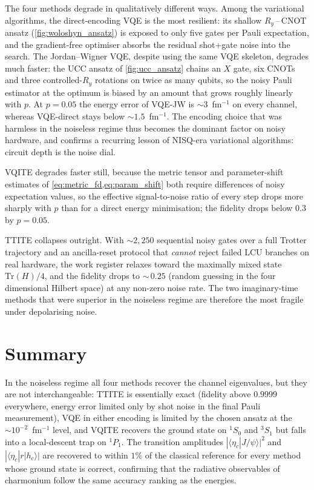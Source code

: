 The four methods degrade in qualitatively different ways. Among the
variational algorithms, the direct-encoding VQE is the most resilient:
its shallow $R_y$\,--\,CNOT ansatz (\cref{fig:woloshyn_ansatz}) is
exposed to only five gates per Pauli expectation, and the gradient-free
optimiser absorbs the residual shot+gate noise into the search. The
Jordan--Wigner VQE, despite using the same VQE skeleton, degrades much
faster: the UCC ansatz of \cref{fig:ucc_ansatz} chains an $X$ gate, six
CNOTs and three controlled-$R_y$ rotations on twice as many qubits, so
the noisy Pauli estimator at the optimum is biased by an amount that
grows roughly linearly with $p$. At $p = 0.05$ the energy error of
VQE-JW is $\sim\!3$~fm$^{-1}$ on every channel, whereas VQE-direct stays
below $\sim\!1.5$~fm$^{-1}$. The encoding choice that was harmless in
the noiseless regime thus becomes the dominant factor on noisy
hardware, and confirms a recurring lesson of NISQ-era variational
algorithms: circuit depth is the noise dial.

VQITE degrades faster still, because the metric tensor and
parameter-shift estimates of \cref{eq:metric_fd,eq:param_shift} both
require differences of noisy expectation values, so the effective
signal-to-noise ratio of every step drops more sharply with $p$ than for
a direct energy minimisation; the fidelity drops below $0.3$ by
$p = 0.05$.

TTITE collapses outright. With $\sim\!2{,}250$ sequential noisy gates
over a full Trotter trajectory and an ancilla-reset protocol that
\emph{cannot} reject failed LCU branches on real hardware, the work
register relaxes toward the maximally mixed state $\mathrm{Tr}(H)/4$,
and the fidelity drops to ${\sim}\,0.25$ (random guessing in the four
dimensional Hilbert space) at any non-zero noise rate. The two
imaginary-time methods that were superior in the noiseless regime are
therefore the most fragile under depolarising noise.

\section{Summary}
\label{sec:results-summary}

In the noiseless regime all four methods recover the channel
eigenvalues, but they are not interchangeable: TTITE is essentially
exact (fidelity above $0.9999$ everywhere, energy error limited only
by shot noise in the final Pauli measurement), VQE in either encoding
is limited by the chosen ansatz at the $\sim 10^{-2}$~fm$^{-1}$ level,
and VQITE recovers the ground state on ${}^1S_0$ and ${}^3S_1$ but
falls into a local-descent trap on ${}^1P_1$. The transition amplitudes
$|\langle\eta_c|J/\psi\rangle|^{2}$ and $|\langle\eta_c|r|h_c\rangle|$
are recovered to within $1\%$ of the classical reference for every
method whose ground state is correct, confirming that the radiative
observables of charmonium follow the same accuracy ranking as the
energies.

